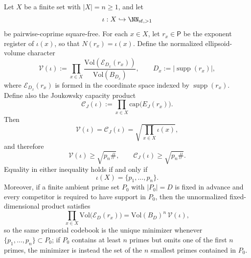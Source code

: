\begin{theorem}\label{thm:capacity-normalized-primorial-extremality}
Let \(X\) be a finite set with \(|X|=n\ge1\), and let
\[
\iota:X\hookrightarrow \NN_{\mathrm{sf},>1}
\]
be pairwise-coprime square-free.  For each \(x\in X\), let \(r_x\in\mathsf P\) be the exponent register of \(\iota(x)\), so that \(N(r_x)=\iota(x)\). Define the normalized ellipsoid-volume character
\[
\mathcal V(\iota):=\prod_{x\in X}\frac{\mathrm{Vol}(\mathcal E_{D_x}(r_x))}{\mathrm{Vol}(B_{D_x})},
\qquad D_x:=|\operatorname{supp}(r_x)|,
\]
where \(\mathcal E_{D_x}(r_x)\) is formed in the coordinate space indexed by \(\operatorname{supp}(r_x)\). Define also the Joukowsky capacity product
\[
\mathcal C_J(\iota):=\prod_{x\in X}\mathrm{cap}\bigl(E_J(r_x)\bigr).
\]
Then
\[
\mathcal V(\iota)=\mathcal C_J(\iota)=\sqrt{\prod_{x\in X}\iota(x)},
\]
and therefore
\[
\mathcal V(\iota)\ge\sqrt{p_n\#},
\qquad
\mathcal C_J(\iota)\ge\sqrt{p_n\#}.
\]
Equality in either inequality holds if and only if
\[
\iota(X)=\{p_1,\dots,p_n\}.
\]
Moreover, if a finite ambient prime set \(P_0\) with \(|P_0|=D\) is fixed in advance and every competitor is required to have support in \(P_0\), then the unnormalized fixed-dimensional product satisfies
\[
\prod_{x\in X}\mathrm{Vol}\bigl(\mathcal E_D(r_x)\bigr)
=\mathrm{Vol}(B_D)^n\,\mathcal V(\iota),
\]
so the same primorial codebook is the unique minimizer whenever \(\{p_1,\dots,p_n\}\subset P_0\); if \(P_0\) contains at least \(n\) primes but omits one of the first \(n\) primes, the minimizer is instead the set of the \(n\) smallest primes contained in \(P_0\).
\end{theorem}

